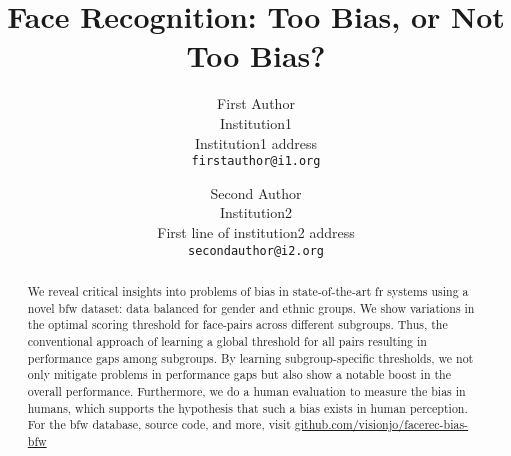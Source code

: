 \documentclass[10pt,twocolumn,letterpaper]{article}
\begin{document}
\title{Face Recognition: Too Bias, or Not Too Bias?}

\author{First Author\\
Institution1\\
Institution1 address\\
{\tt\small firstauthor@i1.org}
\and
Second Author\\
Institution2\\
First line of institution2 address\\
{\tt\small secondauthor@i2.org}
}

\maketitle







\begin{abstract}
We reveal critical insights into problems of bias in state-of-the-art \gls{fr} systems using a novel \gls{bfw} dataset: data balanced for gender and ethnic groups. We show variations in the optimal scoring threshold for face-pairs across different subgroups. Thus, the conventional approach of learning a  global threshold for all pairs resulting in performance gaps among subgroups. By learning subgroup-specific thresholds, we not only mitigate problems in performance gaps but also show a notable boost in the overall performance. Furthermore, we do a human evaluation to measure the bias in humans, which supports the hypothesis that such a bias exists in human perception. For the \gls{bfw} database, source code, and more, visit \href{https://github.com/visionjo/facerec-bias-bfw}{github.com/visionjo/facerec-bias-bfw}
\end{abstract}
\end{document}
